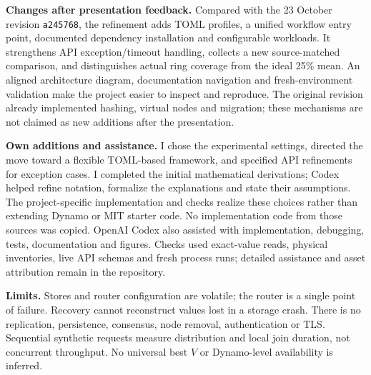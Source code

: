\documentclass[12pt,a4paper]{article}
\begin{document}
\textbf{Changes after presentation feedback.}
Compared with the 23 October revision \texttt{a245768}, the refinement adds TOML
profiles, a unified workflow entry point, documented dependency installation and
configurable workloads. It strengthens API exception/timeout handling, collects
a new source-matched comparison, and distinguishes actual ring coverage from the
ideal 25\% mean. An aligned architecture diagram, documentation navigation and
fresh-environment validation make the project easier to inspect and reproduce.
The original revision already implemented hashing, virtual nodes and migration;
these mechanisms are not claimed as new additions after the presentation.

\textbf{Own additions and assistance.}
I chose the experimental settings, directed the move toward a flexible TOML-based
framework, and specified API refinements for exception cases. I completed the
initial mathematical derivations; Codex helped refine notation, formalize the
explanations and state their assumptions. The project-specific implementation
and checks realize these choices rather than extending Dynamo or MIT starter
code. No implementation code from those sources was copied. OpenAI Codex also
assisted with implementation, debugging, tests, documentation and figures.
Checks used exact-value reads, physical inventories, live API schemas and fresh
process runs; detailed assistance and asset attribution remain in the repository.

\textbf{Limits.}
Stores and router configuration are volatile; the router is a single point of
failure. Recovery cannot reconstruct values lost in a storage crash. There is no
replication, persistence, consensus, node removal, authentication or TLS. Sequential
synthetic requests measure distribution and local join duration, not concurrent
throughput. No universal best $V$ or Dynamo-level availability is inferred.
\end{document}
